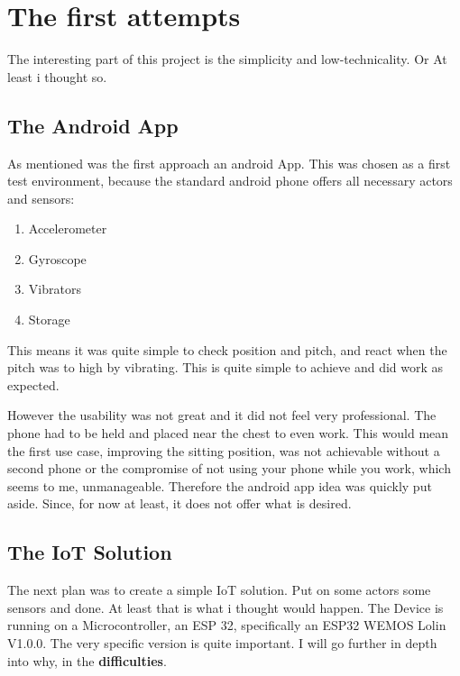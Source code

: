 \chapter*{The first attempts}
\label{chap:The first attempts}
\renewcommand{\thesection}{\arabic{section}}
\setcounter{section}{0}

The interesting part of this project is the simplicity and low-technicality. Or At least i thought so.

\section{The Android App}

As mentioned was the first approach an android App. This was chosen as a first test environment, because the standard android phone offers all necessary actors and sensors: 
\begin{enumerate}
    \item Accelerometer
    \item Gyroscope
    \item Vibrators
    \item Storage
\end{enumerate}

This means it was quite simple to check position and pitch, and react when the pitch was to high by vibrating. This is quite simple to achieve and did work as expected.

However the usability was not great and it did not feel very professional. The phone had to be held and placed near the chest to even work. This would mean the first use case, improving the sitting position, was not achievable without a second phone or the compromise of not using your phone while you work, which seems to me, unmanageable. Therefore the android app idea was quickly put aside. Since, for now at least, it does not offer what is desired.

\newpage
\section{The IoT Solution}

The next plan was to create a simple IoT solution. Put on some actors some sensors and done. At least that is what i thought would happen. The Device is running on a Microcontroller, an ESP 32, specifically an ESP32 WEMOS Lolin V1.0.0. The very specific version is quite important. I will go further in depth into why, in the \textbf{difficulties}.

